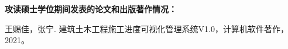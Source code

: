 \begin{publications}{99}
    \item[] {\bf{攻读硕士学位期间发表的论文和出版著作情况：}}
    \item 王赐佳，张宁. 建筑土木工程施工进度可视化管理系统V1.0，计算机软件著作，2021。

    \vspace{1.0cm}



\end{publications}
